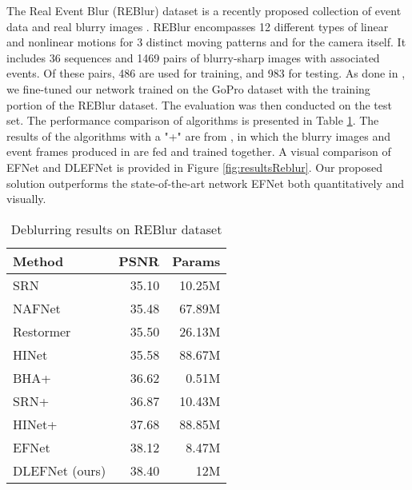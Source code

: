 \documentclass{article}
\begin{document}
The Real Event Blur (REBlur) dataset is a recently proposed collection of event data and real blurry images \cite{EFNet}. REBlur encompasses 12 
different types of linear and nonlinear motions for 3 distinct moving patterns and for the camera itself. It includes 36 sequences and 1469 pairs of 
blurry-sharp images with associated events. Of these pairs, 486 are used for training, and 983 for testing. As done in \cite{EFNet}, 
we fine-tuned our network trained on the GoPro dataset with the training portion of the REBlur dataset. 
The evaluation was then conducted on the test set. The performance comparison of algorithms is presented in Table \ref{tab:results_Reblur}. The results of 
the algorithms with a "+" are from \cite{EFNet}, in which the blurry images and event frames produced in \cite{EFNet} are fed and trained together. 
A visual comparison of EFNet and DLEFNet is provided in Figure \ref{fig:resultsReblur}. Our proposed solution outperforms the state-of-the-art network EFNet both quantitatively and visually.
\begin{table}[]
  \centering
\caption{Deblurring results on REBlur dataset}
\label{tab:results_Reblur}
  \begin{tabular}{lrr}
  \hline
  Method                                           & PSNR                      & Params                     \\ \hline
  SRN ~\cite{tao2018scale}    & 35.10                     & 10.25M                     \\
  NAFNet ~ \cite{Nafnet}      & 35.48 & 67.89M \\
  Restormer~ \cite{restormer} & 35.50                     & 26.13M                     \\
  HINet ~  \cite{chen2021hinet}                 & 35.58                     & 88.67M                     \\
  BHA+ ~\cite{pan2019bringing}                                            & 36.62 & 0.51M  \\
  SRN+ \cite{tao2018scale}  & 36.87                     & 10.43M                     \\
  HINet+~\cite{chen2021hinet}            & 37.68 & 88.85M \\
  EFNet~\cite{EFNet}         & 38.12                     & 8.47M                      \\ \hline
  DLEFNet (ours)                                   & 38.40                     & 12M                        \\ \hline
  \end{tabular}
  \end{table}
\end{document}
